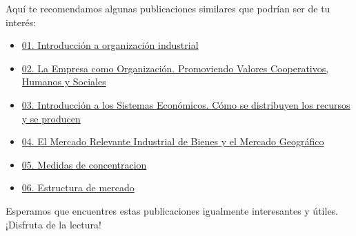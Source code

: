 \documentclass[
  letterpaper,
  DIV=11,
  numbers=noendperiod]{scrartcl}
\begin{document}
Aquí te recomendamos algunas publicaciones similares que podrían ser de
tu interés:

\begin{itemize}
\item
  \href{../2023-06-12-introducion-organizacion-industrial-oi-cap1/index.qmd}{01.
  Introducción a organización industrial}
\item
  \href{../2023-06-13-empresa-como-organizacion-oi-cap1/index.qmd}{02.
  La Empresa como Organización. Promoviendo Valores Cooperativos,
  Humanos y Sociales}
\item
  \href{../2023-06-13-sistemas-economicos-oi.cap1/index.qmd}{03.
  Introducción a los Sistemas Económicos. Cómo se distribuyen los
  recursos y se producen}
\item
  \href{../2023-06-15-mercado-relevante-oi-cap2/index.qmd}{04. El
  Mercado Relevante Industrial de Bienes y el Mercado Geográfico}
\item
  \href{../2023-06-16-concentracion-poder-oi-cap3/index.qmd}{05. Medidas
  de concentracion}
\item
  \href{../2023-06-17-estructura-mercado-oi-cap4/index.qmd}{06.
  Estructura de mercado}
\end{itemize}

Esperamos que encuentres estas publicaciones igualmente interesantes y
útiles. ¡Disfruta de la lectura!


\printbibliography
\end{document}
